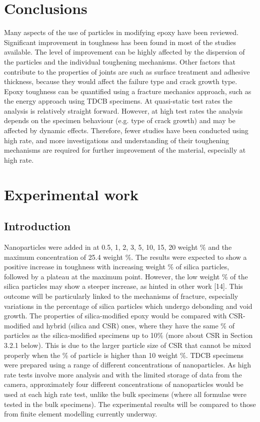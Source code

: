 \documentclass[numbers=noendperiod,chapterprefix=on]{icldt} %
\begin{document}
\section{Conclusions}
Many aspects of the use of particles in modifying epoxy have been reviewed. Significant improvement in toughness has been found in most of the studies available. The level of improvement can be highly affected by the dispersion of the particles and the individual toughening mechanisms. Other factors that contribute to the properties of joints are such as surface treatment and adhesive thickness, because they would affect the failure type and crack growth type.
Epoxy toughness can be quantified using a fracture mechanics approach, such as the energy approach using TDCB specimens. At quasi-static test rates the analysis is relatively straight forward. However, at high test rates the analysis depends on the specimen behaviour (e.g. type of crack growth) and may be affected by dynamic effects.
Therefore, fewer studies have been conducted using high rate, and more investigations and understanding of their toughening mechanisms are required for further improvement of the material, especially at high rate.

\section{Experimental work}
\subsection{Introduction}
Nanoparticles were added in at 0.5, 1, 2, 3, 5, 10, 15, 20 weight \% and the maximum concentration of 25.4 weight \%. The results were expected to show a positive increase in toughness with increasing weight \% of silica particles, followed by a plateau at the maximum point. However, the low weight \% of the silica particles may show a steeper increase, as hinted in other work [14]. This outcome will be particularly linked to the mechanisms of fracture, especially variations in the percentage of silica particles which undergo debonding and void growth. The properties of silica-modified epoxy would be compared with CSR-modified and hybrid (silica and CSR) ones, where they have the same \% of particles as the silica-modified specimens up to 10\% (more about CSR in Section 3.2.1 below). This is due to the larger particle size of CSR that cannot be mixed properly when the \% of particle is higher than 10 weight \%.
TDCB specimens were prepared using a range of different concentrations of nanoparticles. As high rate tests involve more analysis and with the limited storage of data from the camera, approximately four different concentrations of nanoparticles would be used at each high rate test, unlike the bulk specimens (where all formulae were tested in the bulk specimens).
The experimental results will be compared to those from finite element modelling currently underway.
\end{document}
